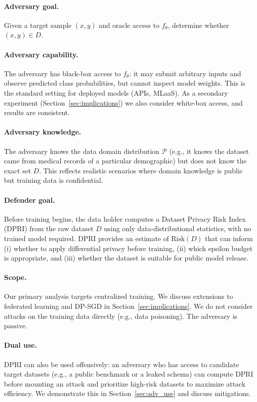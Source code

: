 \paragraph{Adversary goal.}
Given a target sample $(x,y)$ and oracle access to $f_\theta$,
determine whether $(x,y) \in D$.

\paragraph{Adversary capability.}
The adversary has black-box access to $f_\theta$: it may submit
arbitrary inputs and observe predicted class probabilities, but cannot
inspect model weights. This is the standard setting for deployed models
(APIs, MLaaS).
As a secondary experiment (Section~\ref{sec:implications}) we also consider
white-box access, and results are consistent.

\paragraph{Adversary knowledge.}
The adversary knows the data domain distribution $\mathcal{P}$
(e.g., it knows the dataset came from medical records of a particular
demographic) but does not know the exact set $D$.
This reflects realistic scenarios where domain knowledge is public but
training data is confidential.

\paragraph{Defender goal.}
Before training begins, the data holder computes a Dataset Privacy
Risk Index (DPRI) from the raw dataset $D$ using only data-distributional
statistics, with no trained model required.
DPRI provides an estimate of $\mathrm{Risk}(D)$ that can inform
(i) whether to apply differential privacy before training,
(ii) which epsilon budget is appropriate, and
(iii) whether the dataset is suitable for public model release.

\paragraph{Scope.}
Our primary analysis targets centralized training.
We discuss extensions to federated learning and DP-SGD in
Section~\ref{sec:implications}.
We do not consider attacks on the training data directly (e.g., data
poisoning). The adversary is passive.

\paragraph{Dual use.}
DPRI can also be used offensively: an adversary who has access to
candidate target datasets (e.g., a public benchmark or a leaked schema)
can compute DPRI before mounting an attack and prioritize
high-risk datasets to maximize attack efficiency.
We demonstrate this in Section~\ref{sec:adv_use} and discuss mitigations.
